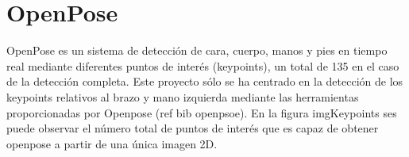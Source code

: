 \section{OpenPose}
OpenPose es un sistema de detección de cara, cuerpo, manos y pies en tiempo real mediante diferentes puntos de interés (keypoints), un total de 135 en el caso de la detección completa. Este proyecto sólo se ha centrado en la detección de los keypoints relativos al brazo y mano izquierda mediante las herramientas proporcionadas por Openpose (ref bib openpsoe).
En la figura imgKeypoints ses puede observar el número total de puntos de interés que es capaz de obtener openpose a partir de una única imagen 2D.\\


